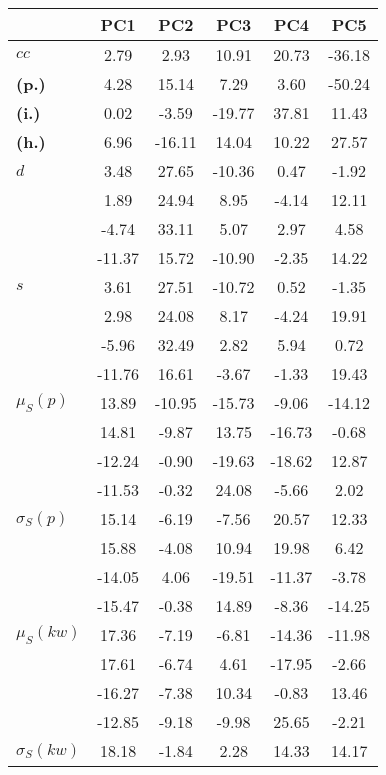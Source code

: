 \begin{table}[h!]
\begin{center}
\begin{tabular}{| l || c | c | c | c | c |}\hline
 & {\bf PC1} & {\bf PC2} & {\bf PC3} & {\bf PC4} & {\bf PC5} \\\hline\hline
{\bf $cc$} & 2.79 & 2.93 & 10.91 & 20.73 & -36.18 \\
{\bf (p.)} & 4.28 & 15.14 & 7.29 & 3.60 & -50.24 \\
{\bf (i.)} & 0.02 & -3.59 & -19.77 & 37.81 & 11.43 \\
{\bf (h.)} & 6.96 & -16.11 & 14.04 & 10.22 & 27.57 \\\hline
{\bf $d$} & 3.48 & 27.65 & -10.36 & 0.47 & -1.92 \\
{\bf } & 1.89 & 24.94 & 8.95 & -4.14 & 12.11 \\
{\bf } & -4.74 & 33.11 & 5.07 & 2.97 & 4.58 \\
{\bf } & -11.37 & 15.72 & -10.90 & -2.35 & 14.22 \\\hline
{\bf $s$} & 3.61 & 27.51 & -10.72 & 0.52 & -1.35 \\
{\bf } & 2.98 & 24.08 & 8.17 & -4.24 & 19.91 \\
 & -5.96  & 32.49  & 2.82  & 5.94  & 0.72 \\
 & -11.76  & 16.61  & -3.67  & -1.33  & 19.43 \\\hline
$\mu_S(p)$ & 13.89  & -10.95  & -15.73  & -9.06  & -14.12 \\
 & 14.81  & -9.87  & 13.75  & -16.73  & -0.68 \\
 & -12.24  & -0.90  & -19.63  & -18.62  & 12.87 \\
 & -11.53  & -0.32  & 24.08  & -5.66  & 2.02 \\\hline
$\sigma_S(p)$ & 15.14  & -6.19  & -7.56  & 20.57  & 12.33 \\
 & 15.88  & -4.08  & 10.94  & 19.98  & 6.42 \\
 & -14.05  & 4.06  & -19.51  & -11.37  & -3.78 \\
 & -15.47  & -0.38  & 14.89  & -8.36  & -14.25 \\\hline
$\mu_S(kw)$ & 17.36  & -7.19  & -6.81  & -14.36  & -11.98 \\
 & 17.61  & -6.74  & 4.61  & -17.95  & -2.66 \\
 & -16.27  & -7.38  & 10.34  & -0.83  & 13.46 \\
 & -12.85  & -9.18  & -9.98  & 25.65  & -2.21 \\\hline
$\sigma_S(kw)$ & 18.18  & -1.84  & 2.28  & 14.33  & 14.17 \\

\end{tabular}
\end{center}
\end{table}
